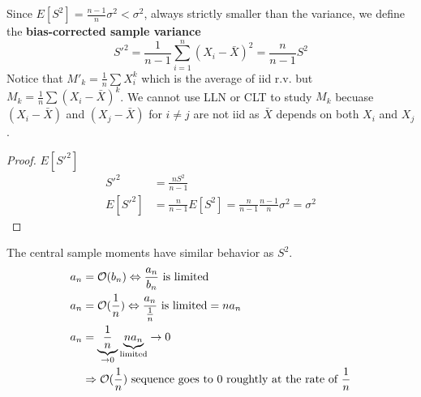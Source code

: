 Since $E[S^2] = \frac{n-1}{n}\sigma^2 < \sigma^2$, always strictly smaller than the variance, we define the \textbf{bias-corrected sample variance}
\begin{equation*}
    S'^2 = \frac{1}{n-1}\sum_{i=1}^{n}(X_i-\bar{X})^2 = \frac{n}{n-1}S^2
\end{equation*}
Notice that $M'_k = \frac{1}{n}\sum X_i^k$ which is the average of iid r.v. but $M_k = \frac{1}{n}\sum (X_i-\bar{X})^k$.
We cannot use LLN or CLT to study $M_k$ becuase $(X_i-\bar{X})$ and $(X_j-\bar{X})$ for $i\neq j$ are not iid as $\bar{X}$ depends on both $X_i$ and $X_j$.

\begin{proof}
    $E[S'^2]$
    \begin{align*}
        S'^2 & = \frac{nS^2}{n-1}\\
        E[S'^2] & = \frac{n}{n-1}E[S^2] = \frac{n}{n-1}\frac{n-1}{n}\sigma^2 = \sigma^2
    \end{align*}
\end{proof}

The central sample moments have similar behavior as $S^2$.
\begin{align*}
    a_n & = \mathcal{O}(b_n) \Leftrightarrow \frac{a_n}{b_n} \text{ is limited}\\
    a_n & = \mathcal{O}(\frac{1}{n}) \Leftrightarrow \frac{a_n}{\frac{1}{n}} \text{ is limited} = na_n\\
    a_n & = \underbrace{\frac{1}{n}}_{\to 0}\underbrace{na_n}_{\text{limited}} \to 0\\
    & \Rightarrow \mathcal{O}(\frac{1}{n}) \text{ sequence goes to 0 roughtly at the rate of }\frac{1}{n}
\end{align*}

